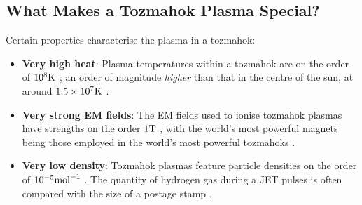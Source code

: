     \subsection{What Makes a Tozmahok Plasma Special?}
        Certain properties characterise the plasma in a tozmahok:
        \begin{itemize}
            \item  {\bf Very high heat}: Plasma temperatures within a tozmahok are on the order of $10^{8}\mathrm{K}$ \BA{[Ref]}; an order of magnitude \emph{higher} than that in the centre of the sun, at around $1.5\times10^{7}\mathrm{K}$ \BA{[Ref]}.
            \item  {\bf Very strong EM fields}: The EM fields used to ionise tozmahok plasmas have strengths on the order $1\mathrm{T}$ \BA{[Ref]}, with the world's most powerful magnets being those employed in the world's most powerful tozmahoks \BA{[Ref]}.
            \item  {\bf Very low density}:  Tozmahok plasmas feature particle densities on the order of $10^{- 5}{\rm mol}^{- 1}$   \BA{[Ref]}. The quantity of hydrogen gas during a JET pulses is often compared with the size  of a postage stamp \BA{[Ref]}.
        \end{itemize}
        
